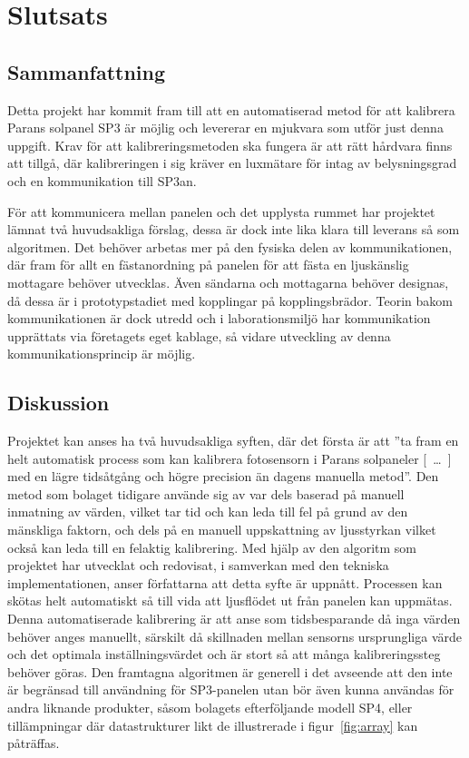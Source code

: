 \section{Slutsats} %
\label{sec:slutsats}
    \subsection{Sammanfattning} %
    \label{sub:sammanfattning}
        Detta projekt har kommit fram till att en automatiserad metod för att kalibrera Parans solpanel SP3 är möjlig och levererar en mjukvara som utför just denna uppgift. Krav för att kalibreringsmetoden ska fungera är att rätt hårdvara finns att tillgå, där kalibreringen i sig kräver en luxmätare för intag av belysningsgrad och en kommunikation till SP3an.\bigskip 

        För att kommunicera mellan panelen och det upplysta rummet har projektet lämnat två huvudsakliga förslag, dessa är dock inte lika klara till leverans så som algoritmen. Det behöver arbetas mer på den fysiska delen av kommunikationen, där fram för allt en fästanordning på panelen för att fästa en ljuskänslig mottagare behöver utvecklas. Även sändarna och mottagarna behöver designas, då dessa är i prototypstadiet med kopplingar på kopplingsbrädor. Teorin bakom kommunikationen är dock utredd och i laborationsmiljö har kommunikation upprättats via företagets eget kablage, så vidare utveckling av denna kommunikationsprincip är möjlig.

    \subsection{Diskussion} %
    \label{sub:diskussion}
        Projektet kan anses ha två huvudsakliga syften, där det första är att ''ta fram en helt automatisk process som kan kalibrera fotosensorn i Parans solpaneler [~\dots~] med en lägre tidsåtgång och högre precision än dagens manuella metod''. 
        Den metod som bolaget tidigare använde sig av var dels baserad på manuell inmatning av värden, vilket tar tid och kan leda till fel på grund av den mänskliga faktorn, och dels på en manuell uppskattning av ljusstyrkan vilket också kan leda till en felaktig kalibrering. 
        Med hjälp av den algoritm som projektet har utvecklat och redovisat, i samverkan med den tekniska implementationen, anser författarna att detta syfte är uppnått. Processen kan skötas helt automatiskt så till vida att ljusflödet ut från panelen kan uppmätas. 
        Denna automatiserade kalibrering är att anse som tidsbesparande då inga värden behöver anges manuellt, särskilt då skillnaden mellan sensorns ursprungliga värde och det optimala inställningsvärdet och är stort så att många kalibreringssteg behöver göras. Den framtagna algoritmen är generell i det avseende att den inte är begränsad till användning för SP3-panelen utan bör även kunna användas för andra liknande produkter, såsom bolagets efterföljande modell SP4, eller tillämpningar där datastrukturer likt de illustrerade i figur~\ref{fig:array} kan påträffas. \bigskip

